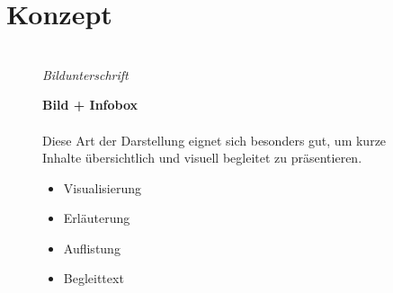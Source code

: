 \chapter{Konzept}

\begin{figure}[htbp] %
\begin{tcbraster}[raster columns=2, raster height=13.5cm, raster column skip=5mm]
\begin{tcolorbox}[colback=white, colframe=white, boxrule=0pt]
\centering
{}
\\ \vspace{0.2cm}
\textit{Bildunterschrift}
\end{tcolorbox}
\begin{tcolorbox}[colback=white, arc=3mm, boxrule=1.5pt]
\textbf{Bild + Infobox} \\
\\
Diese Art der Darstellung eignet sich besonders gut, um kurze Inhalte übersichtlich und visuell begleitet zu präsentieren.
\begin{itemize}[leftmargin=*, itemsep=4pt]
\item Visualisierung
\item Erläuterung
\item Auflistung
\item Begleittext
\end{itemize}
\end{tcolorbox}
\end{tcbraster}
\end{figure}